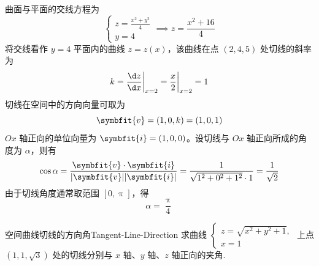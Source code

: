 \begin{solution}
    曲面与平面的交线方程为
    \begin{equation}
        \begin{cases}
            z = \frac{x^2+y^2}{4} \\
            y = 4
        \end{cases} \implies z = \frac{x^2+16}{4}
    \end{equation}
    将交线看作 $y=4$ 平面内的曲线 $z = z(x)$，该曲线在点 $(2, 4, 5)$ 处切线的斜率为
    \begin{equation}
        k = \frac{\d z}{\d x} \bigg|_{x=2} = \frac{x}{2} \bigg|_{x=2} = 1
    \end{equation}
    切线在空间中的方向向量可取为
    \begin{equation}
        \symbfit{v} = (1, 0, k) = (1, 0, 1)
    \end{equation}
    $Ox$ 轴正向的单位向量为 $\symbfit{i} = (1, 0, 0)$。设切线与 $Ox$ 轴正向所成的角度为 $\alpha$，则有
    \begin{equation}
        \cos \alpha = \frac{\symbfit{v} \cdot \symbfit{i}}{|\symbfit{v}| |\symbfit{i}|} = \frac{1}{\sqrt{1^2 + 0^2 + 1^2} \cdot 1} = \frac{1}{\sqrt{2}}
    \end{equation}
    由于切线角度通常取范围 $[0, \uppi]$，得
    \begin{equation}
        \boxed{\alpha = \frac{\uppi}{4}}
    \end{equation}
\end{solution}


\begin{problem}{空间曲线切线的方向角}{Tangent-Line-Direction}
    求曲线 $\begin{cases} z = \sqrt{x^2 + y^2 + 1}, \\ x = 1 \end{cases}$ 上点 $(1, 1, \sqrt{3})$ 处的切线分别与 $x$ 轴、$y$ 轴、$z$ 轴正向的夹角.
\end{problem}

